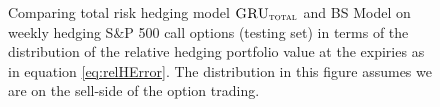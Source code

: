 \documentclass[letterpaper,12pt,titlepage,oneside,final]{book}
\numberwithin{equation}{section}
\theoremstyle{definition}
\newcommand{\modelT}{\textsc{GRU}_{\textsc{total}}}
\begin{document}
\begin{figure}[htp!]
	\centering
	\caption{Comparing total risk hedging  model $\modelT$ and BS Model  on weekly hedging S\&P 500 call options (testing set) in terms of the distribution of the  relative hedging portfolio value at the expiries as in equation \eqref{eq:relHError}. The distribution in this figure assumes we are on the sell-side of the option trading.} 
	\label{fig:CallTotalW2}
	\centering

\end{figure}
\end{document}
